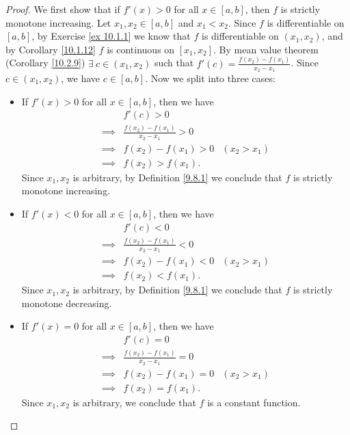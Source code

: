 \begin{proof}
    We first show that if \(f'(x) > 0\) for all \(x \in [a, b]\), then \(f\) is strictly monotone increasing.
    Let \(x_1, x_2 \in [a, b]\) and \(x_1 < x_2\).
    Since \(f\) is differentiable on \([a, b]\), by Exercise \ref{ex 10.1.1} we know that \(f\) is differentiable on \((x_1, x_2)\), and by Corollary \ref{10.1.12} \(f\) is continuous on \([x_1, x_2]\).
    By mean value theorem (Corollary \ref{10.2.9}) \(\exists\ c \in (x_1, x_2)\) such that \(f'(c) = \frac{f(x_2) - f(x_1)}{x_2 - x_1}\).
    Since \(c \in (x_1, x_2)\), we have \(c \in [a, b]\).
    Now we split into three cases:
    \begin{itemize}
        \item If \(f'(x) > 0\) for all \(x \in [a, b]\), then we have
              \begin{align*}
                           & f'(c) > 0                                           \\
                  \implies & \frac{f(x_2) - f(x_1)}{x_2 - x_1} > 0               \\
                  \implies & f(x_2) - f(x_1) > 0                   & (x_2 > x_1) \\
                  \implies & f(x_2) > f(x_1).
              \end{align*}
              Since \(x_1, x_2\) is arbitrary, by Definition \ref{9.8.1} we conclude that \(f\) is strictly monotone increasing.
        \item If \(f'(x) < 0\) for all \(x \in [a, b]\), then we have
              \begin{align*}
                           & f'(c) < 0                                           \\
                  \implies & \frac{f(x_2) - f(x_1)}{x_2 - x_1} < 0               \\
                  \implies & f(x_2) - f(x_1) < 0                   & (x_2 > x_1) \\
                  \implies & f(x_2) < f(x_1).
              \end{align*}
              Since \(x_1, x_2\) is arbitrary, by Definition \ref{9.8.1} we conclude that \(f\) is strictly monotone decreasing.
        \item If \(f'(x) = 0\) for all \(x \in [a, b]\), then we have
              \begin{align*}
                           & f'(c) = 0                                           \\
                  \implies & \frac{f(x_2) - f(x_1)}{x_2 - x_1} = 0               \\
                  \implies & f(x_2) - f(x_1) = 0                   & (x_2 > x_1) \\
                  \implies & f(x_2) = f(x_1).
              \end{align*}
              Since \(x_1, x_2\) is arbitrary, we conclude that \(f\) is a constant function.
    \end{itemize}
\end{proof}


